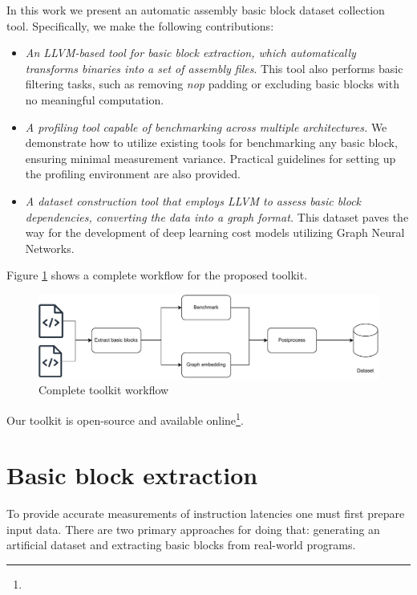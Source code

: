 In this work we present an automatic assembly basic block dataset collection tool. Specifically, we make 
the following contributions:
\begin{itemize}
  \item \textit{An LLVM-based tool for basic block extraction, which automatically transforms binaries into a set 
        of assembly files}. This tool also performs basic filtering tasks, such as removing \textit{nop} 
        padding or excluding basic blocks with no meaningful computation.
  \item \textit{A profiling tool capable of benchmarking across multiple architectures.} We demonstrate how to utilize
        existing tools for benchmarking any basic block, ensuring minimal measurement variance. Practical 
        guidelines for setting up the profiling environment are also provided.
  \item \textit{A dataset construction tool that employs LLVM to assess basic block dependencies, converting the 
        data into a graph format.} This dataset paves the way for the development of deep learning cost 
        models utilizing Graph Neural Networks.
\end{itemize}

Figure \ref{fig:workflow} shows a complete workflow for the proposed toolkit.

\begin{figure}[h]
  \centering
  \includegraphics[width=0.8\linewidth]{workflow}
  \caption{Complete toolkit workflow}
  \label{fig:workflow}
\end{figure}

Our toolkit is open-source and available online\footnote{}.

\section{Basic block extraction}

To provide accurate measurements of instruction latencies one must first prepare input data. There are 
two primary approaches for doing that: generating an artificial dataset and extracting basic blocks from
real-world programs.

